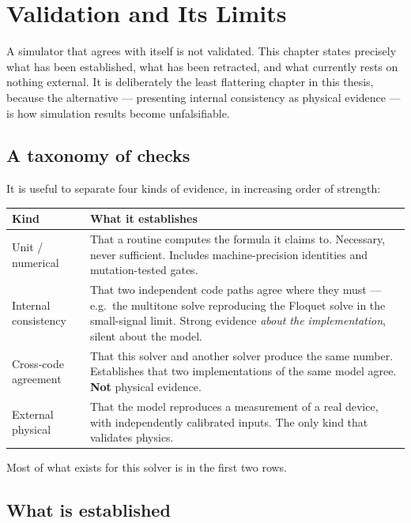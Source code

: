 \chapter{Validation and Its Limits}
\label{chap:validation}

A simulator that agrees with itself is not validated. This chapter states
precisely what has been established, what has been retracted, and what currently
rests on nothing external. It is deliberately the least flattering chapter in
this thesis, because the alternative --- presenting internal consistency as
physical evidence --- is how simulation results become unfalsifiable.

\section{A taxonomy of checks}

It is useful to separate four kinds of evidence, in increasing order of strength:

\begin{center}
\begin{tabular}{@{}l p{}@{}}
\toprule
\textbf{Kind} & \textbf{What it establishes} \\
\midrule
Unit / numerical
& That a routine computes the formula it claims to. Necessary, never sufficient.
  Includes machine-precision identities and mutation-tested gates. \\
\addlinespace
Internal consistency
& That two independent code paths agree where they must --- e.g.\ the multitone
  solve reproducing the Floquet solve in the small-signal limit. Strong evidence
  \emph{about the implementation}, silent about the model. \\
\addlinespace
Cross-code agreement
& That this solver and another solver produce the same number. Establishes that
  two implementations of the same model agree. \textbf{Not} physical evidence. \\
\addlinespace
External physical
& That the model reproduces a measurement of a real device, with independently
  calibrated inputs. The only kind that validates physics. \\
\bottomrule
\end{tabular}
\end{center}

Most of what exists for this solver is in the first two rows.

\section{What is established}

